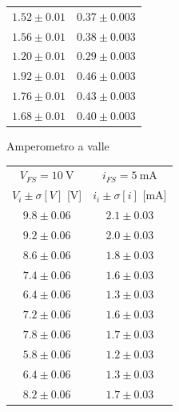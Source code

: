 \documentclass{article}
\begin{document}
\begin{figure}
\begin{multicols}{2}
\begin{center}
\begin{tabular}{c|c}
$1.52 \pm 0.01 $&$0.37 \pm 0.003$\\

$1.56 \pm 0.01 $&$0.38 \pm 0.003$\\

$1.20 \pm 0.01 $&$0.29 \pm 0.003$\\

$1.92 \pm 0.01 $&$0.46 \pm 0.003$\\

$1.76 \pm 0.01 $&$0.43 \pm 0.003$\\

$1.68 \pm 0.01 $&$0.40 \pm 0.003$\\

\end{tabular}
\end{center} 
\end{multicols}

\begin{center}
    \large{Amperometro a valle}
\end{center}
\begin{multicols}{2}
\begin{center}
\begin{tabular}{c|c} 
$V_{FS}=\SI{10}{\volt}$&$i_{FS}=\SI{5}{\milli\ampere}$\\
$V_i \pm \sigma [V]$ [\si{\volt}] & $i_i \pm \sigma [i]$ [\si{\milli\ampere}]\\
[0.5ex]
\hline
$9.8 \pm 0.06 $&$2.1 \pm 0.03$\\

$9.2 \pm 0.06 $&$2.0 \pm 0.03$\\

$8.6 \pm 0.06 $&$1.8 \pm 0.03$\\

$7.4 \pm 0.06 $&$1.6 \pm 0.03$\\

$6.4 \pm 0.06 $&$1.3 \pm 0.03$\\

$7.2 \pm 0.06 $&$1.6 \pm 0.03$\\

$7.8 \pm 0.06 $&$1.7 \pm 0.03$\\

$5.8 \pm 0.06 $&$1.2 \pm 0.03$\\

$6.4 \pm 0.06 $&$1.3 \pm 0.03$\\

$8.2 \pm 0.06 $&$1.7 \pm 0.03$\\

\end{tabular}
\end{center} 


\end{multicols}
\end{figure}
\end{document}
